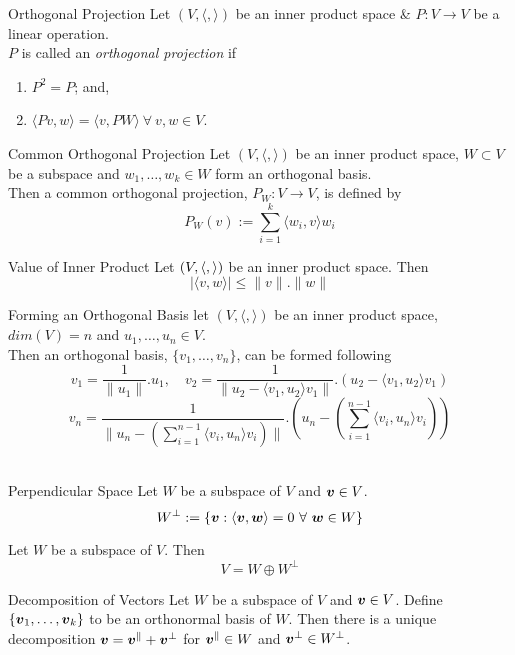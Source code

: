 \documentclass[11pt,a4paper]{article}
\begin{document}
\subtitle{Definition 9.12 - }{Orthogonal Projection}
Let $(V, \langle,\rangle)$ be an inner product space \& $P : V \to V$ be a linear operation.\\
$P$ is called an \textit{orthogonal projection} if
\begin{enumerate}[label=\roman*)]
  \item $P^2 = P$; and,
  \item $\langle Pv, w\rangle = \langle v, PW\rangle\ \forall\ v, w \in V$.
\end{enumerate}

\subtitle{Proposition 9.13 - }{Common Orthogonal Projection}
Let $(V, \langle, \rangle)$ be an inner product space, $W \subset V$ be a subspace and $w_1, \dots , w_k \in W$ form an orthogonal basis.\\
Then a common orthogonal projection, $P_W : V \to V$, is defined by
$$P_W(v) := \sum_{i=1}^k \langle w_i, v \rangle w_i$$

\subtitle{Theorem 9.14 - }{Value of Inner Product}
Let $(V, \langle , \rangle)$ be an inner product space. Then
$$|\langle v, w \rangle| \leq \|v\|.\|w\|$$

\subtitle{Theorem 9.15 - }{Forming an Orthogonal Basis}
let $(V, \langle,\rangle)$ be an inner product space, $dim(V) = n$ and $u_1 , \dots , u_n \in V$.\\
Then an orthogonal basis, $\{v_1, \dots , v_n\}$, can be formed following
$$v_1 = \frac{1}{\|u_1\|}.u_1, \quad v_2 = \frac{1}{\|u_2 - \langle v_1, u_2\rangle v_1\|}.(u_2 - \langle v_1, u_2\rangle v_1)$$
$$v_n = \frac{1}{\|u_n - (\sum_{i=1}^{n-1}\langle v_i, u_n\rangle v_i)\|}.\left(u_n - \left(\sum_{i=1}^{n-1}\langle v_i, u_n\rangle v_i\right)\right)$$\\

\subtitle{Defintion 9.16 - }{Perpendicular Space}
Let $W$ be a subspace of $V$ and $\boldsymbol{v} \in V$.
$$W^{\bot} := \{\boldsymbol{v} : \langle \boldsymbol{v}, \boldsymbol{w} \rangle = 0\ \forall\ \boldsymbol{w} \in W\}$$

\subtitle{Theorem 9.17}{}
Let $W$ be a subspace of $V$. Then
$$V = W \oplus W^{\bot}$$

\subtitle{Proposition 9.17 - }{Decomposition of Vectors}
Let $W$ be a subspace of $V$ and $\boldsymbol{v} \in V$.
Define $\{\boldsymbol{v}_1, \dots , \boldsymbol{v}_k\}$ to be an orthonormal basis of $W$.
Then there is a unique decomposition $\boldsymbol{v} = \boldsymbol{v}^{\|} + \boldsymbol{v}^{\bot}$ for $\boldsymbol{v}^{\|} \in W$ and $\boldsymbol{v}^{\bot} \in W^{\bot}$.\\
\end{document}
